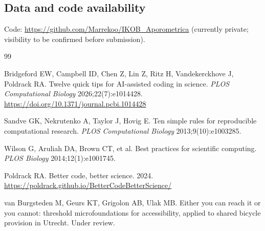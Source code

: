 \documentclass[11pt]{article}
\begin{document}
\subsection*{Data and code availability}
Code: \url{https://github.com/Marrekoo/IKOB_Aporometrica} (currently
private; visibility to be confirmed before submission).


\begin{thebibliography}{99}

Bridgeford EW, Campbell ID, Chen Z, Lin Z, Ritz H, Vandekerckhove J, Poldrack RA.
Twelve quick tips for AI-assisted coding in science.
\textit{PLOS Computational Biology} 2026;22(7):e1014428.
\url{https://doi.org/10.1371/journal.pcbi.1014428}

Sandve GK, Nekrutenko A, Taylor J, Hovig E.
Ten simple rules for reproducible computational research.
\textit{PLOS Computational Biology} 2013;9(10):e1003285.

Wilson G, Aruliah DA, Brown CT, et al.
Best practices for scientific computing.
\textit{PLOS Biology} 2014;12(1):e1001745.

Poldrack RA. Better code, better science. 2024.
\url{https://poldrack.github.io/BetterCodeBetterScience/}

van Burgsteden M, Geurs KT, Grigolon AB, Ulak MB.
Either you can reach it or you cannot: threshold microfoundations for
accessibility, applied to shared bicycle provision in Utrecht.
Under review.

\end{thebibliography}
\end{document}
